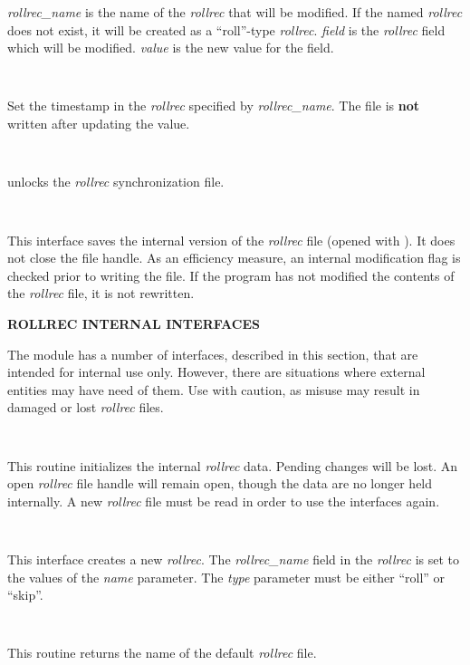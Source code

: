 \begin{description}
{\it rollrec\_name} is the name of the {\it rollrec} that will be modified.  If
the named {\it rollrec} does not exist, it will be created as a ``roll''-type
{\it rollrec}.  {\it field} is the {\it rollrec} field which will be modified.
{\it value} is the new value for the field.

\item {}\verb" "

Set the timestamp in the {\it rollrec} specified by {\it rollrec\_name}.
The file is {\bf not} written after updating the value.

\item {}\verb" "

 unlocks the {\it rollrec} synchronization file.

\item {}\verb" "

This interface saves the internal version of the {\it rollrec} file (opened
with ).  It does not close the file handle.  As an
efficiency measure, an internal modification flag is checked prior to writing
the file.  If the program has not modified the contents of the {\it rollrec}
file, it is not rewritten.

\end{description}

{\bf ROLLREC INTERNAL INTERFACES}

The  module has a number of interfaces,
described in this section, that are intended for internal use only.  However,
there are situations where external entities may have need of them.  Use with
caution, as misuse may result in damaged or lost {\it rollrec} files.

\begin{description}

\item {}\verb" "

This routine initializes the internal {\it rollrec} data.  Pending changes
will be lost.  An open {\it rollrec} file handle will remain open, though the
data are no longer held internally.  A new {\it rollrec} file must be read in
order to use the  interfaces again.

\item {}\verb" "

This interface creates a new {\it rollrec}.  The {\it rollrec\_name} field in
the {\it rollrec} is set to the values of the {\it name} parameter.  The {\it
type} parameter must be either ``roll'' or ``skip''.

\item {}\verb" "

This routine returns the name of the default {\it rollrec} file.

\end{description}

